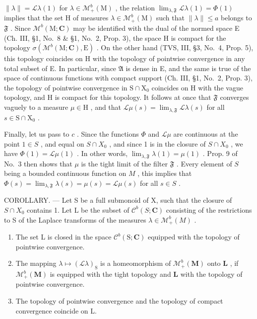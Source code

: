 \(\| \lambda \| = \mathcal{L}\lambda (1)\) for \(\lambda \in \mathcal{M}_{+}^{b}(\mathrm{M})\) , the relation \(\lim_{\lambda ,\mathfrak{F}}\mathcal{L}\lambda (1) = \Phi (1)\) implies that the set H of measures \(\lambda \in \mathcal{M}_{+}^{b}(\mathrm{M})\) such that \(\| \lambda \| \leqslant a\) belongs to \(\mathfrak{F}\) . Since \(\mathcal{M}^b (\mathrm{M};\mathbf{C})\) may be identified with the dual of the normed space E (Ch. III, §1, No.~8 \& §1, No.~2, Prop. 3), the space H is compact for the topology \(\sigma (\mathcal{M}^b (\mathrm{M};\mathbf{C}),\mathrm{E})\) . On the other hand (TVS, III, §3, No.~4, Prop. 5), this topology coincides on H with the topology of pointwise convergence in any total subset of E. In particular, since \(\mathfrak{A}\) is dense in E, and the same is true of the space of continuous functions with compact support (Ch. III, §1, No.~2, Prop. 3), the topology of pointwise convergence in \(\mathrm{S}\cap \mathrm{X}_0\) coincides on H with the vague topology, and H is compact for this topology. It follows at once that \(\mathfrak{F}\) converges vaguely to a measure \(\mu \in \mathrm{H}\) , and that \(\mathcal{L}\mu (s) = \lim_{\lambda ,\mathfrak{F}}\mathcal{L}\lambda (s)\) for all \(s\in \mathrm{S}\cap \mathrm{X}_0\) .

Finally, let us pass to \(c\) . Since the functions \(\Phi\) and \(\mathcal{L}\mu\) are continuous at the point \(1 \in S\) , and equal on \(S \cap X_0\) , and since 1 is in the closure of \(S \cap X_0\) , we have \(\Phi(1) = \mathcal{L}\mu(1)\) . In other words, \(\lim_{\lambda, \mathfrak{F}} \lambda(1) = \mu(1)\) . Prop. 9 of No.~3 then shows that \(\mu\) is the tight limit of the filter \(\mathfrak{F}\) . Every element of \(S\) being a bounded continuous function on \(M\) , this implies that \(\Phi(s) = \lim_{\lambda, \mathfrak{F}} \lambda(s) = \mu(s) = \mathcal{L}\mu(s)\) for all \(s \in S\) .

COROLLARY. --- Let S be a full submonoid of X, such that the closure of \(S \cap X_{0}\) contains 1. Let L be the subset of \(\mathcal{C}^{b}(S; \mathbf{C})\) consisting of the restrictions to S of the Laplace transforms of the measures \(\lambda \in \mathcal{M}_{+}^{b}(M)\) .

\begin{enumerate}
\def\labelenumi{\alph{enumi})}
\item
  The set L is closed in the space \(\mathcal{C}^{b}(\mathrm{S};\mathbf{C})\) equipped with the topology of pointwise convergence.
\item
  The mapping \(\lambda \mapsto (\mathcal{L}\lambda)_\mathrm{S}\) is a homeomorphism of \(\mathcal{M}_+^b (\mathbf{M})\) onto \(\mathbf{L}\) , if \(\mathcal{M}_+^b (\mathbf{M})\) is equipped with the tight topology and \(\mathbf{L}\) with the topology of pointwise convergence.
\item
  The topology of pointwise convergence and the topology of compact convergence coincide on L.
\end{enumerate}

